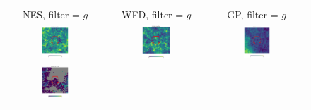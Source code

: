 \documentclass[preprintm,linenumbers]{aastex631}
\begin{document}
  	\begin{figure}
			\centering
			\begin{tabular}{  c c c}
                 NES, filter = $g$ & WFD, filter = $g$ & GP, filter = $g$ \\
				\includegraphics[width=0.3\textwidth]{results/skymaps_cutout/skymaps_cutout_first_year_one_snap_v4_0_10yrs_db_noDD_noTwi_nside-256_CountMetric_g_NES_noDD_noTwi.pdf} &
				\includegraphics[width=0.3\textwidth]{results/skymaps_cutout/skymaps_cutout_first_year_one_snap_v4_0_10yrs_db_noDD_noTwi_nside-256_CountMetric_g_WFD_noDD_noTwi.pdf} &
				\includegraphics[width=0.3\textwidth]{results/skymaps_cutout/skymaps_cutout_first_year_one_snap_v4_0_10yrs_db_noDD_noTwi_nside-256_CountMetric_g_GP_noDD_noTwi.pdf} \\
				\includegraphics[width=0.3\textwidth]{results/skymaps_cutout/skymaps_cutout_first_year_one_snap_v4_0_10yrs_db_noDD_noTwi_tscale-28_nside-256_doAllTemplateMetrics_reduceCount_g_NES_noDD_noTwi.pdf} &

\end{tabular}
\end{figure}
\end{document}
